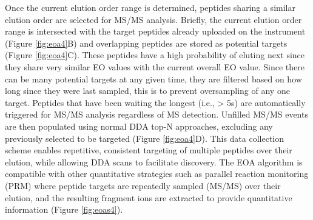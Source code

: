 Once the current elution order range is determined, peptides sharing a similar elution order are selected for MS/MS analysis. Briefly, the current elution order range is intersected with the target peptides already uploaded on the instrument (Figure \ref{fig:eoa4}B) and overlapping peptides are stored as potential targets (Figure \ref{fig:eoa4}C). These peptides have a high probability of eluting next since they share very similar EO values with the current overall EO value. Since there can be many potential targets at any given time, they are filtered based on how long since they were last sampled, this is to prevent oversampling of any one target. Peptides that have been waiting the longest (i.e., > 5s) are automatically triggered for MS/MS analysis regardless of MS detection. Unfilled MS/MS events are then populated using normal DDA top-N approaches, excluding any \mz{} previously selected to be targeted (Figure \ref{fig:eoa4}D). This data collection scheme enables repetitive, consistent targeting of multiple peptides over their elution, while allowing DDA scans to facilitate discovery. The EOA algorithm is compatible with other quantitative strategies such as parallel reaction monitoring (PRM) where peptide targets are repeatedly sampled (MS/MS) over their elution, and the resulting fragment ions are extracted to provide quantitative information (Figure \ref{fig:eoas4}).\cite{prm,gallien}
